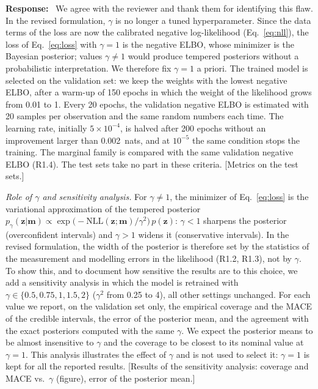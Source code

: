 \documentclass[11pt]{article}
\newenvironment{response}{\par\smallskip\noindent\color{resp}\textbf{Response:}\ }{\par}
\newcommand{\tbd}[1]{\textcolor{note}{\textsf{[#1]}}}
\newcommand{\m}{\mathbf{m}}
\newcommand{\z}{\mathbf{z}}
\begin{document}
\begin{response}
We agree with the reviewer and thank them for identifying this flaw. In the revised formulation, $\gamma$ is no longer
a tuned hyperparameter. Since the data terms of the loss are now the calibrated negative log-likelihood
(Eq.~\eqref{eq:nll}), the loss of Eq.~\eqref{eq:loss} with $\gamma=1$ is the negative ELBO, whose minimizer is the
Bayesian posterior; values $\gamma\neq1$ would produce tempered posteriors without a probabilistic interpretation. We
therefore fix $\gamma=1$ a priori. The trained model is selected on the validation set: we keep the weights with the
lowest negative ELBO, after a warm-up of 150 epochs in which the weight of the likelihood grows from 0.01 to 1. Every 20
epochs, the validation negative ELBO is estimated with 20 samples per observation and the same random numbers each time.
The learning rate, initially $5\times10^{-4}$, is halved after 200 epochs without an improvement larger than 0.002~nats,
and at $10^{-5}$ the same condition stops the training. The marginal family is compared with the same validation
negative ELBO (R1.4). The test sets take no part in these criteria.
\tbd{Metrics on the test sets.}

\textit{Role of $\gamma$ and sensitivity analysis.} For $\gamma\neq1$, the minimizer of Eq.~\eqref{eq:loss} is the
variational approximation of the tempered posterior $p_\gamma(\z|\m)\propto\exp\big(-\mathrm{NLL}(\z;\m)/\gamma^2\big)\,
p(\z)$: $\gamma<1$ sharpens the posterior (overconfident intervals) and $\gamma>1$ widens it (conservative intervals).
In the revised formulation, the width of the posterior is therefore set by the statistics of the measurement and
modelling errors in the likelihood (R1.2, R1.3), not by $\gamma$. To show this, and to document how sensitive the
results are to this choice, we add a sensitivity analysis in which the model is retrained with
$\gamma\in\{0.5,0.75,1,1.5,2\}$ ($\gamma^2$ from 0.25 to 4), all other settings unchanged. For each value we report,
on the validation set only, the empirical coverage and the MACE of the credible intervals, the error of the posterior
mean, and the agreement with the exact posteriors computed with the same $\gamma$. We expect the posterior means to be
almost insensitive to $\gamma$ and the coverage to be closest to its nominal value at $\gamma=1$. This analysis
illustrates the effect of $\gamma$ and is not used to select it: $\gamma=1$ is kept for all the reported results.
\tbd{Results of the sensitivity analysis: coverage and MACE vs.\ $\gamma$ (figure), error of the posterior mean.}
\end{response}
\end{document}
